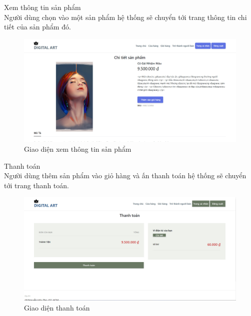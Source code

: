 \documentclass{article}
\begin{document}
{{{{{{{{{{{{{{{{{\begin{center}
\begin{figure}[htp]
		\end{figure}
	\end{center}
}
\newpage

{\large 
	\indent	Xem thông tin sản phẩm\\
		{\large
		Người dùng chọn vào một sản phẩm hệ thống sẽ chuyển tới trang thông tin chi tiết của sản phẩm đó.}
	\begin{center}
		\begin{figure}[htp]
			\begin{center}
				\includegraphics[scale=.250]{anh34.jpg}
			\end{center}
			\caption{Giao diện xem thông tin sản phẩm}
			
		\end{figure}
	\end{center}
}
\newpage
{\large 
	\indent	Thanh toán\\
	{\large
		Người dùng thêm sản phẩm vào giỏ hàng và ấn thanh toán  hệ thống sẽ chuyển tới trang thanh toán.}
	\begin{center}
		\begin{figure}[htp]
			\begin{center}
				\includegraphics[scale=.250]{anh35.jpg}
			\end{center}
			\caption{Giao diện thanh toán}
			

\end{figure}
\end{center}}}}}}}}}}}}}}}}}}
\end{document}
